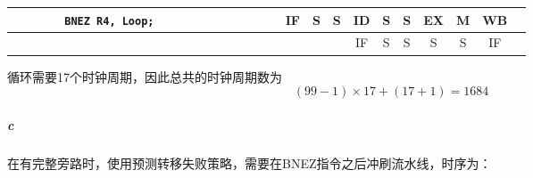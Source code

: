 \documentclass{article}
\begin{document}
\begin{table}[H]
{\begin{tabular}{|l|c|c|c|c|c|c|c|c|c|c|c|c|c|c|c|c|c|c|c|}
    \texttt{~~~~~~~~BNEZ R4, Loop; }     &    &    &    &                          &                          &    &                          &                          &    & IF & {\color[HTML]{CB0000} S} & {\color[HTML]{CB0000} S} & ID & {\color[HTML]{CB0000} S} & {\color[HTML]{CB0000} S} & EX                       & M                        & WB &    \\ \hline
                      &    &    &    &                          &                          &    &                          &                          &    &    &                          &                          & IF & {\color[HTML]{CB0000} S} & {\color[HTML]{CB0000} S} & {\color[HTML]{CB0000} S} & {\color[HTML]{CB0000} S} & IF &    \\ \hline
    \end{tabular}
    }
\end{table}
循环需要17个时钟周期，因此总共的时钟周期数为
$$
    (99 - 1) \times 17 + (17 + 1) = 1684
$$
\subparagraph{c}
在有完整旁路时，使用预测转移失败策略，需要在BNEZ指令之后冲刷流水线，时序为：
\end{document}

